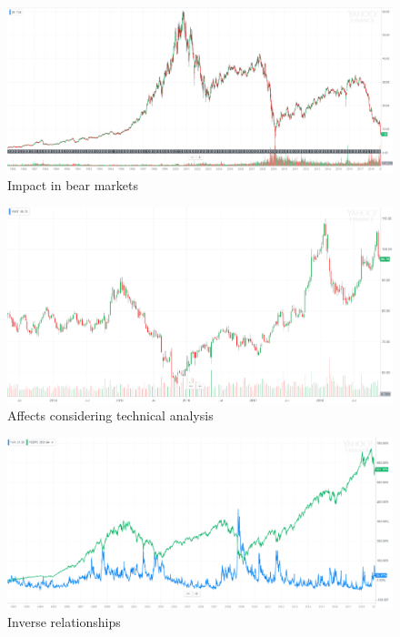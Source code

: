 \documentclass{article}
\begin{document}
\vspace{10pt}

\begin{figure}[!htb]
    \centering
    \includegraphics[width=\textwidth]{imgs/31.png}
    \caption{Impact in bear markets}
\end{figure}

\vspace{10pt}

\begin{figure}[!htb]
    \centering
    \includegraphics[width=\textwidth]{imgs/32.png}
    \caption{Affects considering technical analysis}
\end{figure}

\vspace{10pt}

\begin{figure}[!htb]
    \centering
    \includegraphics[width=\textwidth]{imgs/33.png}
    \caption{Inverse relationships}
\end{figure}
\end{document}
